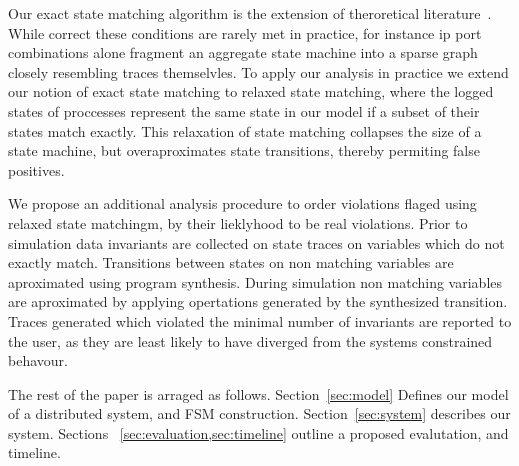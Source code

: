 Our exact state matching algorithm is the extension of theroretical
literature~\cite{Garg:2014:MAS:2580115.2580404}. While correct these conditions
are rarely met in practice, for instance ip port combinations alone fragment an
aggregate state machine into a sparse graph closely resembling traces
themselvles. To apply our analysis in practice we extend our notion of exact
state matching to relaxed state matching, where the logged states of proccesses
represent the same state in our model if a subset of their states match
exactly. This relaxation of state matching collapses the size of a state
machine, but overaproximates state transitions, thereby permiting false
positives.

We propose an additional analysis procedure to order violations flaged using
relaxed state matchingm, by their lieklyhood to be real violations. Prior to
simulation data invariants are collected on state traces on variables which do
not exactly match. Transitions between states on non matching variables are
aproximated using program synthesis. During simulation non matching variables
are aproximated by applying opertations generated by the synthesized
transition. Traces generated which violated the minimal number of invariants
are reported to the user, as they are least likely to have diverged from the
systems constrained behavour.

The rest of the paper is arraged as follows. Section~\ref{sec:model} Defines
our model of a distributed system, and FSM construction.
Section~\ref{sec:system} describes our system. Sections
~\ref{sec:evaluation,sec:timeline} outline a proposed evalutation, and
timeline.
